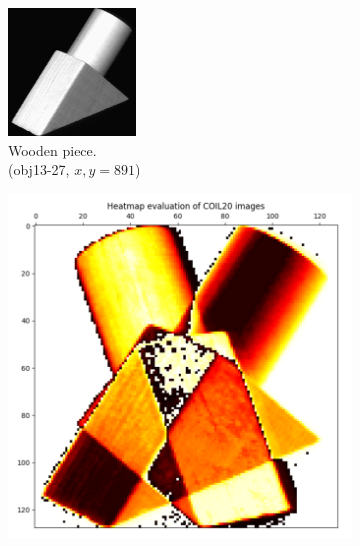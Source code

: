 \begin{figure}[!]
     \centering
     \begin{subfigure}[t]{0.32\columnwidth}
    	\centering
    	\includegraphics[width=\columnwidth]{images/coil-20-proc/obj13__27.png}
    	\caption{Wooden piece. \\ (obj13-27, $x,y=891$)}
        \label{fig:obj13__27}
    \end{subfigure}
     \hfill
     \begin{subfigure}[t]{0.32\columnwidth}
    	\centering
    	\includegraphics[width=\columnwidth]{images/heatmap_coil20_same.png}

\end{subfigure}
\end{figure}
